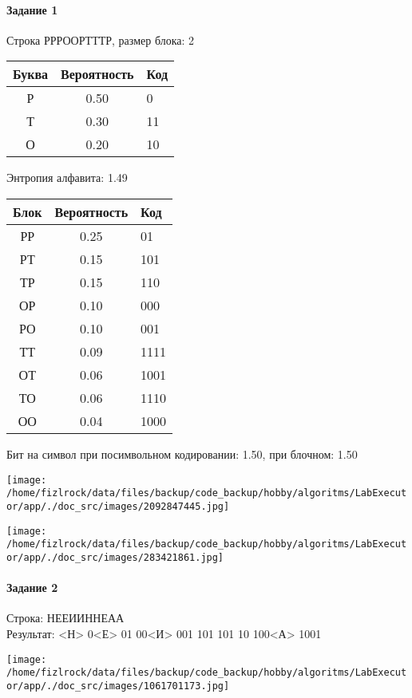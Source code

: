 \documentclass[a4paper, 12pt]{article}
\begin{document}
\paragraph{Задание 1}

Строка РРРООРТТТР, размер блока: 2
\begin{center}
 \begin{tabular}{ |c|c|l| } 
  \hline
     Буква & Вероятность & Код\\ \hline
Р & 0.50 & 0\\\hline
Т & 0.30 & 11\\\hline
О & 0.20 & 10
\\ \hline \end{tabular}
\end{center}
Энтропия алфавита: 1.49
\begin{center}
 \begin{tabular}{ |c|c|l| } 
  \hline
     Блок & Вероятность & Код\\ \hline
РР & 0.25 & 01\\\hline
РТ & 0.15 & 101\\\hline
ТР & 0.15 & 110\\\hline
ОР & 0.10 & 000\\\hline
РО & 0.10 & 001\\\hline
ТТ & 0.09 & 1111\\\hline
ОТ & 0.06 & 1001\\\hline
ТО & 0.06 & 1110\\\hline
ОО & 0.04 & 1000
\\ \hline \end{tabular}
\end{center}
Бит на символ при посимвольном кодировании: 1.50, при блочном: 1.50

\texttt{[image: /home/fizlrock/data/files/backup/code\_backup/hobby/algoritms/LabExecutor/app/./doc\_src/images/2092847445.jpg]}

\texttt{[image: /home/fizlrock/data/files/backup/code\_backup/hobby/algoritms/LabExecutor/app/./doc\_src/images/283421861.jpg]}
\pagebreak
\paragraph{Задание 2}

Строка: 
НЕЕИИННЕАА\\
Результат: <Н> 0<Е> 01 00<И> 001 101 101 10 100<А> 1001

\texttt{[image: /home/fizlrock/data/files/backup/code\_backup/hobby/algoritms/LabExecutor/app/./doc\_src/images/1061701173.jpg]}
\end{document}
